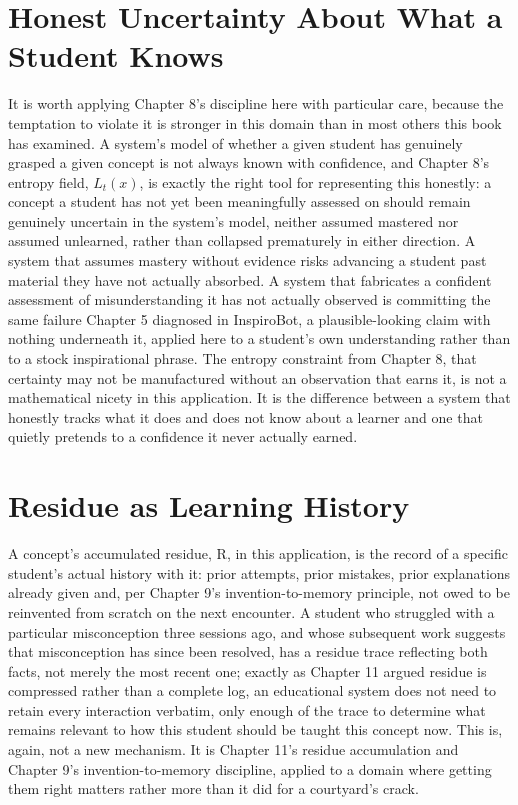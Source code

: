 \section{Honest Uncertainty About What a Student Knows}

It is worth applying Chapter 8's discipline here with particular care, because the temptation to violate it is stronger in this domain than in most others this book has examined. A system's model of whether a given student has genuinely grasped a given concept is not always known with confidence, and Chapter 8's entropy field, \(L_t(x)\), is exactly the right tool for representing this honestly: a concept a student has not yet been meaningfully assessed on should remain genuinely uncertain in the system's model, neither assumed mastered nor assumed unlearned, rather than collapsed prematurely in either direction. A system that assumes mastery without evidence risks advancing a student past material they have not actually absorbed. A system that fabricates a confident assessment of misunderstanding it has not actually observed is committing the same failure Chapter 5 diagnosed in InspiroBot, a plausible-looking claim with nothing underneath it, applied here to a student's own understanding rather than to a stock inspirational phrase. The entropy constraint from Chapter 8, that certainty may not be manufactured without an observation that earns it, is not a mathematical nicety in this application. It is the difference between a system that honestly tracks what it does and does not know about a learner and one that quietly pretends to a confidence it never actually earned.

\section{Residue as Learning History}

A concept's accumulated residue, R, in this application, is the record of a specific student's actual history with it: prior attempts, prior mistakes, prior explanations already given and, per Chapter 9's invention-to-memory principle, not owed to be reinvented from scratch on the next encounter. A student who struggled with a particular misconception three sessions ago, and whose subsequent work suggests that misconception has since been resolved, has a residue trace reflecting both facts, not merely the most recent one; exactly as Chapter 11 argued residue is compressed rather than a complete log, an educational system does not need to retain every interaction verbatim, only enough of the trace to determine what remains relevant to how this student should be taught this concept now. This is, again, not a new mechanism. It is Chapter 11's residue accumulation and Chapter 9's invention-to-memory discipline, applied to a domain where getting them right matters rather more than it did for a courtyard's crack.

